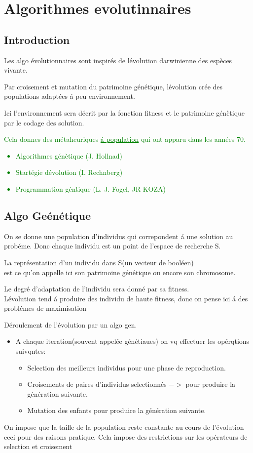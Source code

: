 \chapter{Algorithmes evolutinnaires}

\section{Introduction}

Les algo \'evolutionnaires sont inspir\'es de l\'evolution darwinienne des esp\`eces vivante.


Par croisement et mutation du patrimoine g\'en\'etique, l\'evolution cr\'ee des populations adapt\'ees \'a peu environnement.

Ici l'environnement sera d\'ecrit par la fonction fitness et le patrimoine g\'en\`etique par le codage des solution.
\textcolor{green}{
Cela donnes des m\'etaheuriques \underline{\'a population}  qui ont apparu dans les ann\'ees 70.\\
\begin{itemize}
\item Algorithmes g\'en\`etique (J. Hollnad)
\item Start\'egie d\'evolution (I. Rechnberg)
\item Programmation g\'en\`tique (L. J. Fogel, JR KOZA)
\end{itemize}
				}
\section{Algo Ge\'en\'etique}
On se donne une population d'individus qui correpondent \'a une solution au prob\'eme.
Donc chaque individu est un point de l'espace de recherche S.

La repr\'esentation d'un individu dans S(\eg  un vecteur de bool\'een) \\
est ce qu'on appelle ici son patrimoine g\'en\'etique ou encore son chromosome.

Le degr\'e d'adaptation de l'individu sera donn\'e par sa fitness. \\L\'evolution tend \'a produire des individu de haute fitness, donc on pense ici \'a des probl\'emes de maximisation


D\'eroulement de l'\'evolution par un algo gen.

\begin{itemize}
\item A chaque iteration(souvent appelée génétiaues) on vq effectuer les opérqtions suivqntes:
\begin{itemize}
\item Selection des meilleurs individus pour une phase de reproduction.
\item Croisements de paires d'individus selectionn\'es $->$ pour produire la g\'en\'eration suivante.
\item Mutation des enfants pour produire la g\'en\'eration suivante.
\end{itemize}
\end{itemize}
On impose que la taille de la population reste constante au cours de l'\'evolution ceci pour des raisons pratique. Cela impose des restrictions sur les op\'erateurs de selection et croisement

